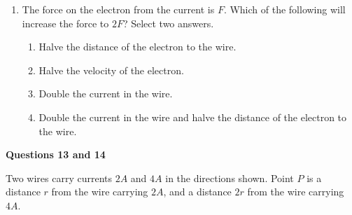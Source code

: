 \documentclass{../../oss-apphys}
\begin{document}
\begin{multicols}{2}
\begin{enumerate}[leftmargin=18pt]
  \item The force on the electron from the current is $F$. Which of the
    following will increase the force to $2F$? Select two answers.
    \begin{enumerate}[noitemsep,topsep=0pt,leftmargin=18pt,label=(\Alph*)]
    \item Halve the distance of the electron to the wire.
    \item Halve the velocity of the electron.
    \item Double the current in the wire.
    \item Double the current in the wire and halve the distance of the electron
      to the wire.
    \end{enumerate}
  \end{enumerate}

  \columnbreak

  \textbf{Questions 13 and 14}

  Two wires carry currents $2A$ and $4A$ in the directions shown. Point $P$ is
  a distance $r$ from the wire carrying $2A$, and a distance $2r$ from the wire
  carrying $4A$.
  \begin{center}
  \end{center}


\end{multicols}
\end{document}
